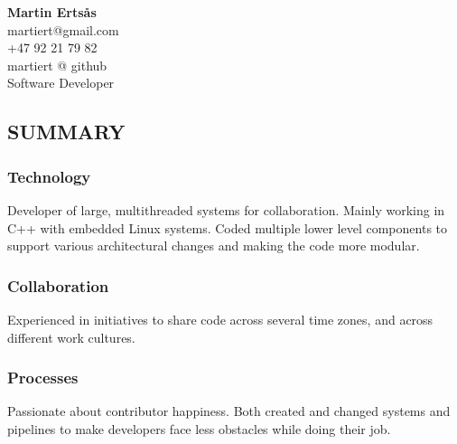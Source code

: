 \documentclass{article}
\begin{document}
\begin{center}

{\large\bf Martin Erts\aa s}\\
\bigskip
martiert@gmail.com\\
+47 92 21 79 82\\
martiert @ github\\
Software Developer\\
\end{center}

\subsection*{SUMMARY}

\begin{multicols}{2}

  \begin{addmargin}[2em]{0em}
    \subsubsection*{Technology}

    \begin{addmargin}[1em]{0em}
      Developer of large, multithreaded systems for collaboration. Mainly working in C++
      with embedded Linux systems. Coded multiple lower level components to support various
      architectural changes and making the code more modular.
    \end{addmargin}

    \subsubsection*{Collaboration}

    \begin{addmargin}[1em]{0em}
      Experienced in initiatives to share code across several time zones, and across
      different work cultures.
    \end{addmargin}

    \subsubsection*{Processes}

    \begin{addmargin}[1em]{0em}
      Passionate about contributor happiness. Both created and changed systems and pipelines
      to make developers face less obstacles while doing their job.
    \end{addmargin}


\end{addmargin}
\end{multicols}
\end{document}
